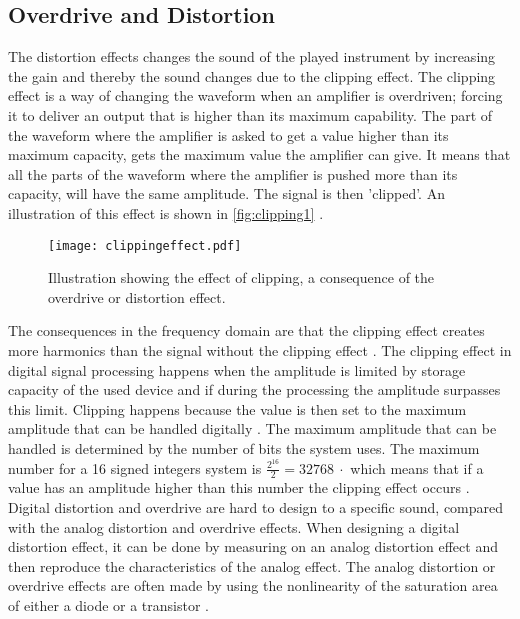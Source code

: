 \subsection{Overdrive and Distortion}\label{sec:overdrive} 

The distortion effects changes the sound of the played instrument by increasing the gain and thereby the sound changes due to the clipping effect.
The clipping effect is a way of changing the waveform when an amplifier is overdriven; forcing it to deliver an output that is higher than its maximum capability. 
The part of the waveform where the amplifier is asked to get a value higher than its maximum capacity, gets the maximum value the amplifier can give. It means that all the parts of the waveform where the amplifier is pushed more than its capacity, will have the same amplitude. The signal is then 'clipped'. An illustration of this effect is shown in \autoref{fig:clipping1} \citep{distortion_clipping1}.\\

\begin{figure} [htbp]
	\centering
  \texttt{[image: clippingeffect.pdf]}
  \caption{Illustration showing the effect of clipping, a consequence of the overdrive or distortion effect.}
  \label{fig:clipping1}
\end{figure} \citep{distortion_clipping1}


The consequences in the frequency domain are that the clipping effect creates more harmonics than the signal without the clipping effect \citep{distortion_harmonics}. 
The clipping effect in digital signal processing happens when the amplitude is limited by storage capacity of the used device and if during the processing the amplitude surpasses this limit. Clipping happens because the value is then set to the maximum amplitude that can be handled digitally \citep{distortion_digital}. The maximum amplitude that can be handled is determined by the number of bits the system uses. The maximum number for a \SI{16}{\bit} signed integers system is $\frac{2^{16}}{2} = \SI{32768}{\cdot}$ which means that if a value has an amplitude higher than this number the clipping effect occurs \citep{distortion_digitalcalc}. 
Digital distortion and overdrive are hard to design to a specific sound, compared with the analog distortion and overdrive effects. When designing a digital distortion effect, it can be done by measuring on an analog distortion effect and then reproduce the characteristics of the analog effect. The analog distortion or overdrive effects are often made by using the nonlinearity of the saturation area of either a diode or a transistor \citep{CCRMA}. 

